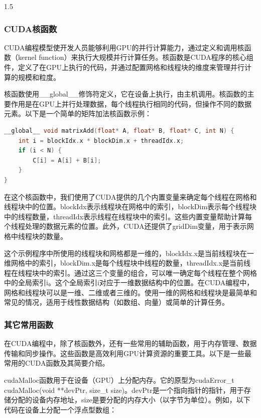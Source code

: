 \documentclass[zihao=-4]{ctexart}
\begin{document}
\begin{spacing}{1.5}
\subsubsection{CUDA核函数}

CUDA编程模型使开发人员能够利用GPU的并行计算能力，通过定义和调用核函数（kernel function）来执行大规模并行计算任务。核函数是CUDA程序的核心组件，定义了在GPU上执行的代码，并通过配置网格和线程块的维度来管理并行计算的规模和粒度。

核函数使用\_\_global\_\_修饰符定义，它在设备上执行，由主机调用。核函数的主要作用是在GPU上并行处理数据，每个线程执行相同的代码，但操作不同的数据元素。以下是一个简单的矩阵加法核函数示例：

\begin{lstlisting}[language=C++,title={核函数示例}]
__global__ void matrixAdd(float* A, float* B, float* C, int N) {
    int i = blockIdx.x * blockDim.x + threadIdx.x;
    if (i < N) {
        C[i] = A[i] + B[i];
    }
}
\end{lstlisting}

在这个核函数中，我们使用了CUDA提供的几个内置变量来确定每个线程在网格和线程块中的位置。blockIdx表示线程块在网格中的索引，blockDim表示每个线程块中的线程数量，threadIdx表示线程在线程块中的索引。这些内置变量帮助计算每个线程处理的数据元素的位置。此外，CUDA还提供了gridDim变量，用于表示网格中线程块的数量。

这个示例程序中所使用的线程块和网格都是一维的，blockIdx.x是当前线程块在一维网格中的索引，blockDim.x是每个线程块中线程的数量，threadIdx.x是当前线程在线程块中的索引。通过这三个变量的组合，可以唯一确定每个线程在整个网格中的全局索引i。这个全局索引i对应于一维数据结构中的位置。在CUDA编程中，网格和线程块可以是一维、二维或者三维的。使用一维的网格和线程块是最简单和常见的情况，适用于线性数据结构（如数组、向量）或简单的计算任务。

\subsubsection{其它常用函数}

在CUDA编程中，除了核函数外，还有一些常用的辅助函数，用于内存管理、数据传输和同步操作。这些函数是高效利用GPU计算资源的重要工具。以下是一些最常用的CUDA函数及其简要介绍。

cudaMalloc函数用于在设备（GPU）上分配内存。它的原型为cudaError\_t cudaMalloc(void **devPtr, size\_t size)。devPtr是一个指向指针的指针，用于存储分配的设备内存地址，size是要分配的内存大小（以字节为单位）。例如，以下代码在设备上分配一个浮点型数组：


\end{spacing}
\end{document}
